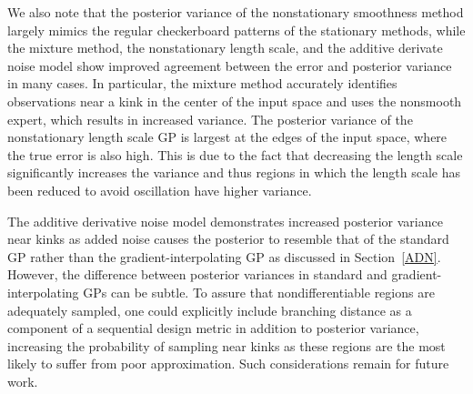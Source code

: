 \documentclass{article}
\numberwithin{equation}{section}
\begin{document}
We also note that the posterior variance of the nonstationary smoothness method largely mimics the regular checkerboard patterns of the stationary methods, while the mixture method, the nonstationary length scale, and the additive derivate noise model show improved agreement between the error and posterior variance in many cases. In particular, the mixture method accurately identifies observations near a kink in the center of the input space and uses the nonsmooth expert, which results in increased variance. The posterior variance of the nonstationary length scale GP is largest at the edges of the input space, where the true error is also high. This is due to the fact that decreasing the length scale significantly increases the variance and thus regions in which the length scale has been reduced to avoid oscillation have higher variance.

The additive derivative noise model demonstrates increased posterior variance near kinks as added noise causes the posterior to resemble that of the standard GP rather than the gradient-interpolating GP as discussed in Section~\ref{ADN}. However, the difference between posterior variances in standard and gradient-interpolating GPs can be subtle. To assure that nondifferentiable regions are adequately sampled, one could explicitly include branching distance as a component of a sequential design metric in addition to posterior variance, increasing the probability of sampling near kinks as these regions are the most likely to suffer from poor approximation. Such considerations remain for future work.
\end{document}
